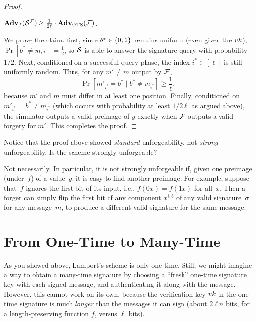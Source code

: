 \documentclass[11pt]{article}
\begin{document}
\begin{proof}
  \begin{claim}
    $\mathbf{Adv}_{f}(\mathcal{S}^{\mathcal{F}}) \geq \frac{1}{2\ell} \cdot
    \mathbf{Adv}_{\text{OTS}}(\mathcal{F})$.
  \end{claim}

  We prove the claim: first, since $b^* \in \{0,1\}$ remains uniform
  (even given the $vk$), $\Pr[b^* \neq m_{i*}] = \frac{1}{2}$, so
  $\mathcal{S}$ is able to answer the signature query with probability $1/2$.
  Next, conditioned on a successful query phase, the index $i^{*} \in
  [\ell]$ is still uniformly random.  Thus, for any $m' \neq m$ output
  by $\mathcal{F}$, \[ \Pr[m'_{i^*} = b^{*} \mid b^* \neq m_{i^{*}} ] \geq
  \frac{1}{\ell}, \] because $m'$ and $m$ must differ in at least one
  position.  Finally, conditioned on $m'_{i^{*}} = b^{*} \neq
  m_{i^{*}}$ (which occurs with probability at least $1/2\ell$ as
  argued above), the simulator outputs a valid preimage of $y$ exactly
  when $\mathcal{F}$ outputs a valid forgery for $m'$.  This completes the
  proof.
\end{proof}

\begin{question}
  Notice that the proof above showed \emph{standard} unforgeability, not \emph{strong} unforgeability.
  Is the scheme strongly unforgeable?
\end{question}

\begin{answer}
  Not necessarily.
  In particular, it is not strongly unforgeable if, given one preimage (under~$f$) of a value~$y$, it is easy to find another preimage.
  For example, suppose that~$f$ ignores the first bit of its input, i.e., $f(0x)=f(1x)$ for all~$x$.
  Then a forger can simply flip the first bit of any component $x^{i,b}$ of any valid signature~$\sigma$ for any message~$m$, to produce a different valid signature for the same message.
\end{answer}

\section{From One-Time to Many-Time}
\label{sec:many-time-signatures}

As you showed above, Lamport's scheme is only one-time. Still, we
might imagine a way to obtain a many-time signature by choosing a
``fresh'' one-time signature key with each signed message, and
authenticating it along with the message.  However, this cannot work
on its own, because the verification key $vk$ in the one-time
signature is much \emph{longer} than the messages it can sign (about
$2 \ell n$ bits, for a length-preserving function $f$, versus $\ell$
bits).
\end{document}
